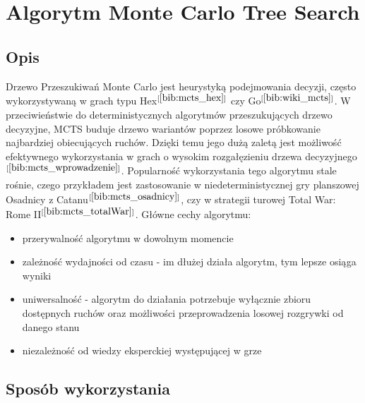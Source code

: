 \section{Algorytm Monte Carlo Tree Search}
\label{sec:mcts}

\subsection{Opis}

Drzewo Przeszukiwań Monte Carlo jest heurystyką podejmowania decyzji, często wykorzystywaną w grach typu Hex$^{[\ref{bib:mcts_hex}]}$ czy Go$^{[\ref{bib:wiki_mcts}]}$. W przeciwieństwie do deterministycznych algorytmów przeszukujących drzewo decyzyjne, MCTS buduje drzewo wariantów poprzez losowe próbkowanie najbardziej obiecujących ruchów. Dzięki temu jego dużą zaletą jest możliwość efektywnego wykorzystania w grach o wysokim rozgałęzieniu drzewa decyzyjnego$^{[\ref{bib:mcts_wprowadzenie}]}$. Popularność wykorzystania tego algorytmu stale rośnie, czego przykładem jest zastosowanie w niedeterministycznej gry planszowej Osadnicy z Catanu$^{[\ref{bib:mcts_osadnicy}]}$, czy w strategii turowej Total War: Rome II$^{[\ref{bib:mcts_totalWar}]}$. Główne cechy algorytmu:
\begin{itemize}
	\item przerywalność algorytmu w dowolnym momencie
	\item zależność wydajności od czasu - im dłużej działa algorytm, tym lepsze osiąga wyniki
	\item uniwersalność - algorytm do działania potrzebuje wyłącznie zbioru dostępnych ruchów oraz możliwości przeprowadzenia losowej rozgrywki od danego stanu
	\item niezależność od wiedzy eksperckiej występującej w grze
\end{itemize}

\subsection{Sposób wykorzystania}

